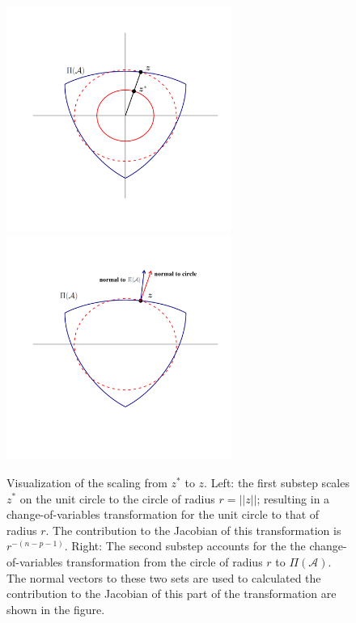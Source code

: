 \documentclass[ba]{imsart}
\newcommand{\bz}{\mbox{\boldmath $z$}}
\begin{document}
\begin{figure}[t]
\centering
{\includegraphics[width=2.9in]{minSSZSpace3.pdf}}
{\includegraphics[width=2.9in]{minSSZSpace5.pdf}}
\label{fig:stretchDeform}
\caption{Visualization of the scaling from $z^{*}$ to $z$. Left: the first substep scales $z^{*}$ on the unit circle to the circle of radius $r = ||z||$; resulting in a change-of-variables transformation for the unit circle to that of radius $r$. The contribution to the Jacobian of this transformation is $r^{-(n-p-1)}$. Right: The second substep accounts for the the change-of-variables transformation from the circle of radius $r$ to $\Pi(\mathcal{A})$. The normal vectors to these two sets are used to calculated the contribution to the Jacobian of this part of the transformation are shown in the figure.}
\end{figure}

\end{document}
